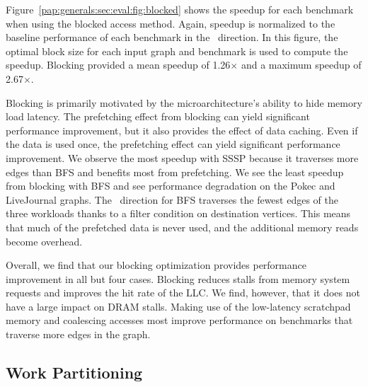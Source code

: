 Figure~\ref{pap:generals:sec:eval:fig:blocked} shows the speedup for each benchmark when using the blocked access method. 
Again, speedup is normalized to the baseline performance of each benchmark in the \pull~direction.
In this figure, the optimal block size for each input graph and benchmark is used to compute the speedup. 
Blocking provided a mean speedup of 1.26$\times$ and a maximum speedup of 2.67$\times$.
 
Blocking is primarily motivated by the microarchitecture's ability to hide memory load latency.
The prefetching effect from blocking can yield significant performance improvement, but it also provides the effect of data caching.
Even if the data is used once, the prefetching effect can yield significant performance improvement. 
We observe the most speedup with SSSP because it traverses more edges than BFS and benefits most from prefetching.
We see the least speedup from blocking with BFS and see performance degradation on the Pokec and LiveJournal graphs.
The \pull~direction for BFS traverses the fewest edges of the three workloads thanks to a filter condition on destination vertices.
This means that much of the prefetched data is never used, and the additional memory reads become overhead.

Overall, we find that our blocking optimization provides performance improvement in all but four cases. 
Blocking reduces stalls from memory system requests and improves the hit rate of the LLC. 
We find, however, that it does not have a large impact on DRAM stalls.
Making use of the low-latency scratchpad memory and coalescing accesses most improve performance on benchmarks that traverse more edges in the graph. 
 
\subsection{Work Partitioning}


